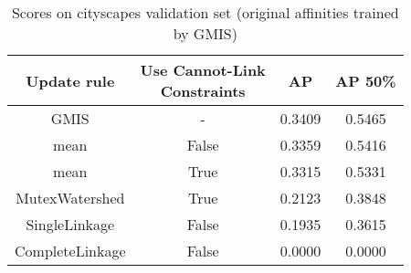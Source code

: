 \begin{table*}
    \centering
    \begin{subtable}[t!]{0.98\textwidth}\centering
        \begin{tabular}{c| c| c | c}
        Update rule & \makecell{Use Cannot-Link\\Constraints} & AP & AP 50\%\\ \midrule\midrule
GMIS & - & {\color{ForestGreen} 0.3409 } & {\color{ForestGreen} 0.5465 } \\
mean & False & {\color{Orange} 0.3359 } & {\color{ForestGreen} 0.5416 } \\
mean & True & {\color{Orange} 0.3315 } & {\color{ForestGreen} 0.5331 } \\
MutexWatershed & True & {\color{Red} 0.2123 } & {\color{Red} 0.3848 } \\
SingleLinkage & False & {\color{Red} 0.1935 } & {\color{Red} 0.3615 } \\
CompleteLinkage & False & {\color{Red} 0.0000 } & {\color{Red} 0.0000 } \\


        \end{tabular}
    \end{subtable} 
    \caption{Scores on cityscapes validation set (original affinities trained by GMIS)}
    \label{tab:linkage-criteria}
\end{table*}


